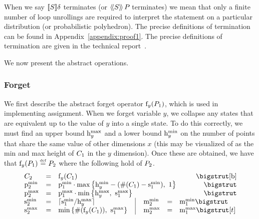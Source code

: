 When we say $ [\![{S}]\!]{\delta} $ terminates (or  $ \langle\!\langle{S}\rangle\!\rangle\,{P_{}} $
terminates) we mean that only a finite number of loop unrollings are
required to interpret the statement on a particular distribution (or
probabilistic polyhedron).
\iffull
The precise
definitions of termination can be found in Appendix~\ref{appendix:proof1}. 
\else
The precise definitions of termination are given in the technical
report~\cite{TR}.
\fi

We now present the abstract operations.

\subsubsection{Forget}

We first describe the abstract forget operator $\mathrm{f}_{y}(P_{1})$, which is used in
implementing assignment.  When we forget variable $y$, we collapse any
states that are equivalent up to the value of $y$ into a single state.
To do this correctly, we must find an upper bound $\mathrm{h}^\mathrm{max}_{y}$ and a lower bound $\mathrm{h}^\mathrm{min}_{y}$
on the number of points that share the same value of other dimensions $x$ (this may be visualized of as the min and max height of $C_{1}$ in the $y$ dimension).
Once these are obtained, we have that $\mathrm{f}_{y}(P_{1}) \stackrel{\smash{\scriptscriptstyle \mathrm{def}}}= P_{2}$ where the following hold of $P_{2}$.
\[
\begin{array}{lcl@{\hspace{0.4cm}}|@{\hspace{0.4cm}}lcl}
\poly_2 &=& \multicolumn{4}{l}{\forget{y}{\poly_1}} \bigstrut[b] \\
\pmin{2} &=& \multicolumn{4}{l}{\pmin{1} \cdot \maxparen{\minh{y}-(\psize{\poly_1} - \smin{1}),\ 1}} \bigstrut \\
\pmax{2} &=& \multicolumn{4}{l}{\pmax{1} \cdot \minparen{\maxh{y},\ \smax{1}}} \bigstrut \\
\smin{2} &=& \lceil{\smin{1} / \maxh{y}}\rceil &
  \mmin{2} &=& \mmin{1} \bigstrut \\
\smax{2} &=& \minparen{\psize{\forget{y}{\poly_1}},\ \smax{1}} &
  \mmax{2} &=& \mmax{1} \bigstrut[t]
\end{array}
\]

